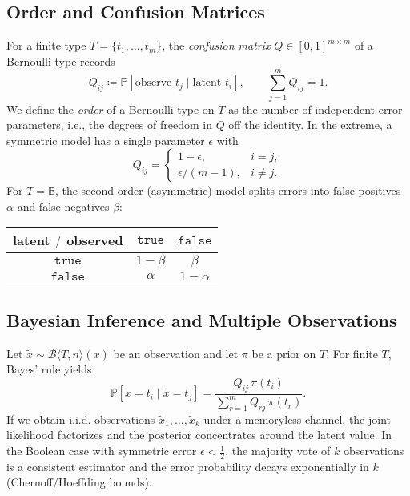 \documentclass[11pt,final,hidelinks]{article}
\newcommand{\bernoulli}[2]{\mathcal{B}\langle #1, #2 \rangle}
\newcommand{\Bool}{\mathbb{B}}
\newcommand{\True}{\mathtt{true}}
\newcommand{\False}{\mathtt{false}}
\newcommand{\Prob}[1]{\mathbb{P}\left[#1\right]}
\newcommand{\fprate}{\alpha}
\newcommand{\fnrate}{\beta}
\begin{document}
\subsection{Order and Confusion Matrices}

For a finite type $T=\{t_1,\dots,t_m\}$, the \emph{confusion matrix} $Q\in[0,1]^{m\times m}$ of a Bernoulli type records
\begin{equation}
    Q_{ij} \coloneqq \Prob{\text{observe } t_j \mid \text{latent } t_i}, \qquad \sum_{j=1}^m Q_{ij}=1.
\end{equation}
We define the \emph{order} of a Bernoulli type on $T$ as the number of independent error parameters, i.e., the degrees of freedom in $Q$ off the identity. In the extreme, a symmetric model has a single parameter $\epsilon$ with
\begin{equation}
    Q_{ij}=\begin{cases}1-\epsilon,& i=j,\\[2pt] \epsilon/(m-1),& i\neq j.\end{cases}
\end{equation}
For $T=\Bool$, the second-order (asymmetric) model splits errors into false positives $\fprate$ and false negatives $\fnrate$:
\begin{center}
\begin{tabular}{c|cc}
latent $\\/\\$ observed & $\True$ & $\False$ \\ \hline
$\True$ & $1-\fnrate$ & $\fnrate$ \\
$\False$ & $\fprate$ & $1-\fprate$
\end{tabular}
\end{center}

\subsection{Bayesian Inference and Multiple Observations}

Let $\tilde{x}\sim\bernoulli{T}{n}(x)$ be an observation and let $\pi$ be a prior on $T$. For finite $T$, Bayes' rule yields
\begin{equation}
    \Prob{x=t_i\mid \tilde{x}=t_j} = \frac{Q_{ij}\,\pi(t_i)}{\sum_{r=1}^m Q_{rj}\,\pi(t_r)}.
\end{equation}
If we obtain i.i.d. observations $\tilde{x}_1,\dots,\tilde{x}_k$ under a memoryless channel, the joint likelihood factorizes and the posterior concentrates around the latent value. In the Boolean case with symmetric error $\epsilon<\tfrac12$, the majority vote of $k$ observations is a consistent estimator and the error probability decays exponentially in $k$ (Chernoff/Hoeffding bounds).
\end{document}
